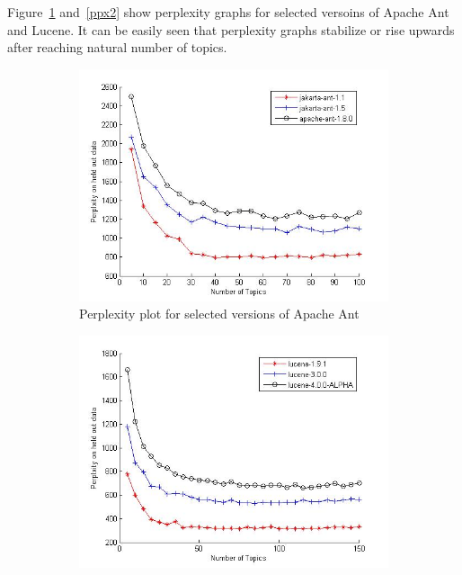 \documentclass[12pt]{article}
\begin{document}
Figure~\ref{ppx1} and~\ref{ppx2} show perplexity graphs for selected versoins of Apache Ant and Lucene. It can be easily seen that perplexity graphs stabilize or rise upwards after reaching natural number of topics.
\begin{figure}
        \centering
        \begin{subfigure}[b]{0.5\textwidth}
                \centering
                \includegraphics[width=\textwidth]{perplexity-ant.jpg}
                \caption{Perplexity plot for selected versions of Apache Ant}
                \label{ppx1}
        \end{subfigure}%
        \begin{subfigure}[b]{0.5\textwidth}
                \centering
                \includegraphics[width=\textwidth]{perplexity-lucene.jpg}

\end{subfigure}
\end{figure}
\end{document}
